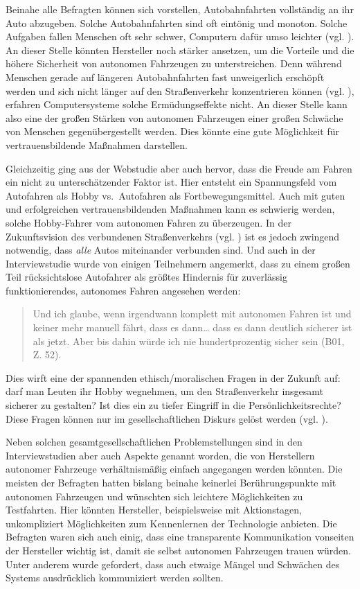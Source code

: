Beinahe alle Befragten können sich vorstellen, Autobahnfahrten vollständig an ihr Auto abzugeben. Solche Autobahnfahrten sind oft eintönig und monoton. Solche Aufgaben fallen Menschen oft sehr schwer, Computern dafür umso leichter (vgl. \cite[15]{norman2013design}). An dieser Stelle könnten Hersteller noch stärker ansetzen, um die Vorteile und die höhere Sicherheit von autonomen Fahrzeugen zu unterstreichen. Denn während Menschen gerade auf längeren Autobahnfahrten fast unweigerlich erschöpft werden und sich nicht länger auf den Straßenverkehr konzentrieren können (vgl. \cite{ting2008driver}), erfahren Computersysteme solche Ermüdungseffekte nicht. An dieser Stelle kann also eine der großen Stärken von autonomen Fahrzeugen einer großen Schwäche von Menschen gegenübergestellt werden. Dies könnte eine gute Möglichkeit für vertrauensbildende Maßnahmen darstellen.

Gleichzeitig ging aus der Webstudie aber auch hervor, dass die Freude am Fahren ein nicht zu unterschätzender Faktor ist. Hier entsteht ein Spannungsfeld vom Autofahren als Hobby vs.\, Autofahren als Fortbewegungsmittel. Auch mit guten und erfolgreichen vertrauensbildenden Maßnahmen kann es schwierig werden, solche \glq Hobby-Fahrer\grq{} vom autonomen Fahren zu überzeugen. In der Zukunftsvision des verbundenen Straßenverkehrs (vgl. \cite{gerla2014internet}) ist es jedoch zwingend notwendig, dass \emph{alle} Autos miteinander verbunden sind. Und auch in der Interviewstudie wurde von einigen Teilnehmern angemerkt, dass zu einem großen Teil rücksichtslose Autofahrer als größtes Hindernis für zuverlässig funktionierendes, autonomes Fahren angesehen werden:

\begin{quote} 
    Und ich glaube, wenn irgendwann komplett mit autonomen Fahren ist und keiner mehr manuell fährt, dass es dann… dass es dann deutlich sicherer ist als jetzt. Aber bis dahin würde ich nie hundertprozentig sicher sein (B01, Z. 52).
\end{quote}

Dies wirft eine der spannenden ethisch/moralischen Fragen in der Zukunft auf: darf man Leuten ihr Hobby wegnehmen, um den Straßenverkehr insgesamt sicherer zu gestalten? Ist dies ein zu tiefer Eingriff in die Persönlichkeitsrechte? Diese Fragen können nur im gesellschaftlichen Diskurs gelöst werden (vgl. \cite[12]{renn2010risk}).

Neben solchen gesamtgesellschaftlichen Problemstellungen sind in den Interviewstudien aber auch Aspekte genannt worden, die von Herstellern autonomer Fahrzeuge verhältnismäßig einfach angegangen werden könnten. Die meisten der Befragten hatten bislang beinahe keinerlei Berührungspunkte mit autonomen Fahrzeugen und wünschten sich leichtere Möglichkeiten zu Testfahrten. Hier könnten Hersteller, beispielsweise mit Aktionstagen, unkompliziert Möglichkeiten zum Kennenlernen der Technologie anbieten. Die Befragten waren sich auch einig, dass eine transparente Kommunikation vonseiten der Hersteller wichtig ist, damit sie selbst autonomen Fahrzeugen trauen würden. Unter anderem wurde gefordert, dass auch etwaige Mängel und Schwächen des Systems ausdrücklich kommuniziert werden sollten.